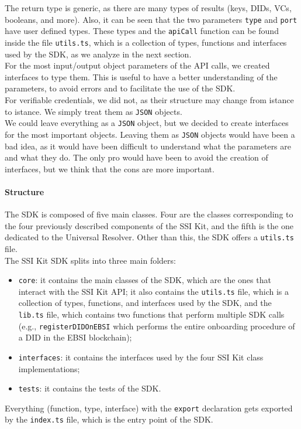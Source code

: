 The return type is generic, as there are many types of results (keys, DIDs, VCs,
booleans, and more). Also, it can be seen that the two parameters \texttt{type} and
\texttt{port} have user defined types. These types and the \texttt{apiCall} function 
can be found inside the file \texttt{utils.ts}, which is a collection of types, 
functions and interfaces used by the SDK, as we analyze in the next section.
\vspace{0.3cm}\\
For the most input/output object parameters of the API calls, we created interfaces
to type them. This is useful to have a better understanding of the parameters, to 
avoid errors and to facilitate the use of the SDK.\\
For verifiable credentials, we did not, as their structure may change from istance
to istance. We simply treat them as \texttt{JSON} objects.\\
We could leave everything as a \texttt{JSON} object, but we decided to create interfaces for
the most important objects. Leaving them as \texttt{JSON} objects would have been a bad idea,
as it would have been difficult to understand what the parameters are and what they
do. The only pro would have been to avoid the creation of interfaces, but we think
that the cons are more important.

\paragraph{Structure}
The SDK is composed of five main classes. Four are the classes corresponding to the 
four previously described components of the SSI Kit, and the fifth is the one dedicated
to the Universal Resolver. Other than this, the SDK offers a \texttt{utils.ts} file.
\vspace{0.3cm}\\
The SSI Kit SDK splits into three main folders:
\begin{itemize}
    \item \texttt{core}: it contains the main classes of the SDK, which are the
    ones that interact with the SSI Kit API; it also contains the \texttt{utils.ts}
    file, which is a collection of types, functions, and interfaces used by the SDK,
    and the \texttt{lib.ts} file, which contains two functions that perform multiple
    SDK calls (e.g., \texttt{registerDIDOnEBSI} which performs the entire onboarding
    procedure of a DID in the EBSI blockchain);
    \item \texttt{interfaces}: it contains the interfaces used by the four SSI Kit
    class implementations;
    \item \texttt{tests}: it contains the tests of the SDK.
\end{itemize}
Everything (function, type, interface) with the \texttt{export} declaration gets exported by the \texttt{index.ts}
file, which is the entry point of the SDK.

